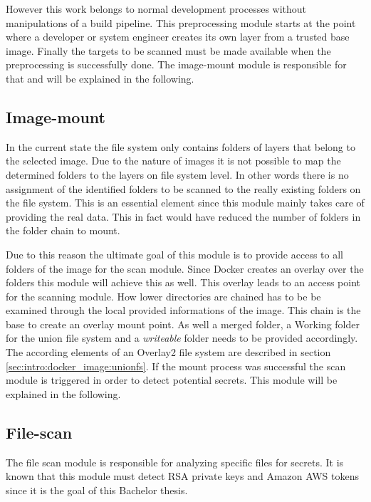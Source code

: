 However this work belongs to normal development processes without manipulations of a build pipeline.
This preprocessing module starts at the point where a developer or system engineer creates its own layer from a trusted base image.
Finally the targets to be scanned must be made available when the preprocessing is successfully done. 
The image-mount module is responsible for that and will be explained in the following.

\subsection{Image-mount}
\label{ch:theory:analyzing_process:imgmount}
In the current state the file system only contains folders of layers that belong to the selected image.
Due to the nature of images it is not possible to map the determined folders to the layers on file system level. 
In other words there is no assignment of the identified folders to be scanned to the really existing folders on the file system.
This is an essential element since this module mainly takes care of providing the real data. 
This in fact would have reduced the number of folders in the folder chain to mount. 

Due to this reason the ultimate goal of this module is to provide access to all folders of the image for the scan module. 
Since Docker creates an overlay over the folders this module will achieve this as well. 
This overlay leads to an access point for the scanning module. 
How lower directories are chained has to be be examined through the local provided informations of the image.
This chain is the base to create an overlay mount point.
As well a merged folder, a Working folder for the union file system and a \textit{writeable} folder needs to be provided accordingly.
The according elements of an Overlay2 file system are described in section \ref{sec:intro:docker_image:unionfs}.
If the mount process was successful the scan module is triggered in order to detect potential secrets. 
This module will be explained in the following.

\subsection{File-scan}
\label{ch:theory:analyzing_process:scan}
The file scan module is responsible for analyzing specific files for secrets. 
It is known that this module must detect RSA private keys and Amazon AWS tokens since it is the goal of this Bachelor thesis.

